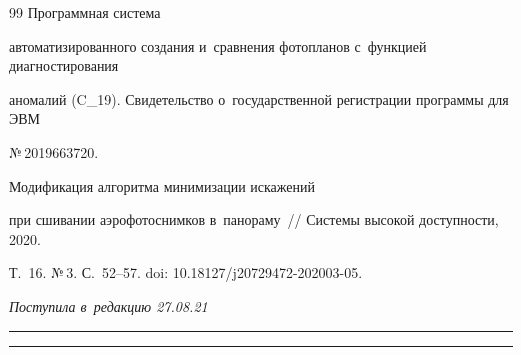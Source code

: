 {{\begin{thebibliography}{99}
   Программная система 


автоматизированного создания и~сравнения фотопланов с~функцией диагностирования 


аномалий (C\_19). Свидетельство о~государственной регистрации программы для ЭВМ 


№\,2019663720. 




   Модификация алгоритма минимизации искажений 


при сшивании аэрофотоснимков в~панораму~/\!\!/ Сис\-те\-мы высокой до\-ступ\-ности, 2020. 


Т.~16. №\,3. С.~52--57. doi: 10.18127\!/\!j20729472-202003-05.


       \end{thebibliography}


} }











\vspace*{-3pt}





\hfill{\small\textit{Поступила в~редакцию 27.08.21}}





\vspace*{8pt}





\hrule





\vspace*{2pt}















\hrule










